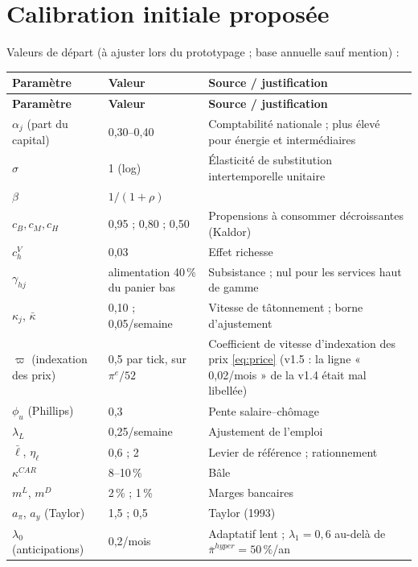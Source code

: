 \documentclass[11pt,a4paper]{article}
\begin{document}
\section{Calibration initiale proposée}
\label{sec:calib}
Valeurs de départ (à ajuster lors du prototypage ; base annuelle sauf mention) :
\begin{center}\small
\begin{longtable}{p{4.2cm}p{3.0cm}p{7.6cm}}
\toprule
\textbf{Paramètre} & \textbf{Valeur} & \textbf{Source / justification}\\
\midrule
\endfirsthead
\toprule
\textbf{Paramètre} & \textbf{Valeur} & \textbf{Source / justification}\\
\midrule
\endhead
$\alpha_j$ (part du capital) & 0,30--0,40 & Comptabilité nationale ; plus élevé pour énergie et intermédiaires\\
$\sigma$ & 1 (log) & Élasticité de substitution intertemporelle unitaire\\
$\beta$ & $1/(1+\rho)$ & \\
$c_B, c_M, c_H$ & 0,95 ; 0,80 ; 0,50 & Propensions à consommer décroissantes (Kaldor)\\
$c^V_h$ & 0,03 & Effet richesse\\
$\gamma_{hj}$ & alimentation 40\,\% du panier bas & Subsistance ; nul pour les services haut de gamme\\
$\kappa_j$, $\bar\kappa$ & 0,10 ; 0,05/semaine & Vitesse de tâtonnement ; borne d'ajustement\\
$\varpi$ (indexation des prix) & 0,5 par tick, sur $\pi^e/52$ & Coefficient de vitesse d'indexation des prix \eqref{eq:price} (v1.5 : la ligne « 0,02/mois » de la v1.4 était mal libellée)\\
$\phi_u$ (Phillips) & 0,3 & Pente salaire--chômage\\
$\lambda_L$ & 0,25/semaine & Ajustement de l'emploi\\
$\bar\ell$, $\eta_\ell$ & 0,6 ; 2 & Levier de référence ; rationnement\\
$\kappa^{CAR}$ & 8--10\,\% & Bâle\\
$m^L$, $m^D$ & 2\,\% ; 1\,\% & Marges bancaires\\
$a_\pi$, $a_y$ (Taylor) & 1,5 ; 0,5 & Taylor (1993)\\
$\lambda_0$ (anticipations) & 0,2/mois & Adaptatif lent ; $\lambda_1 = 0{,}6$ au-delà de $\bar\pi^{hyper}=50\,\%$/an\\

\end{longtable}
\end{center}
\end{document}
